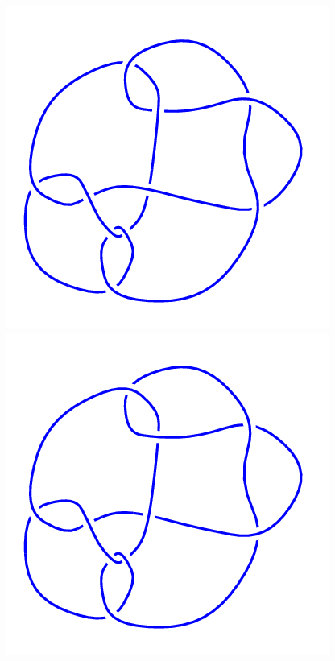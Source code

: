 \begin{figure}[H]
\begin{minipage}[b]{.18\linewidth}
    \end{minipage}
    \begin{minipage}[b]{.18\linewidth}
        \centering
        \includegraphics[width=\linewidth]{../data/10_134.png}
    \end{minipage}
    \begin{minipage}[b]{.18\linewidth}
        \centering
        \includegraphics[width=\linewidth]{../data/10_135.png}

\end{minipage}
\end{figure}
